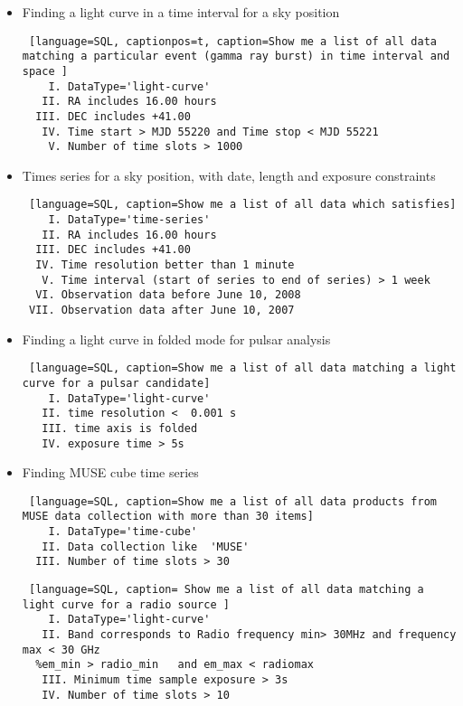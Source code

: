 
\lstset{captionpos=t}
\begin{itemize}
\item  Finding a light curve in a time interval for a sky position 
 \begin{lstlisting} [language=SQL, captionpos=t, caption=Show me a list of all data matching a particular event (gamma ray burst) in time interval and space ]
    I. DataType='light-curve'
   II. RA includes 16.00 hours
  III. DEC includes +41.00
   IV. Time start > MJD 55220 and Time stop < MJD 55221
    V. Number of time slots > 1000 
  \end{lstlisting}

\item  Times series for a sky position, with date, length and exposure constraints
\begin{lstlisting} [language=SQL, caption=Show me a list of all data which satisfies]
    I. DataType='time-series'
   II. RA includes 16.00 hours
  III. DEC includes +41.00
  IV. Time resolution better than 1 minute
   V. Time interval (start of series to end of series) > 1 week
  VI. Observation data before June 10, 2008
 VII. Observation data after June 10, 2007      
  \end{lstlisting}   
    
\item  Finding a light curve in folded mode for pulsar analysis 
\begin{lstlisting} [language=SQL, caption=Show me a list of all data matching a light curve for a pulsar candidate]
    I. DataType='light-curve'
   II. time resolution <  0.001 s 
   III. time axis is folded 
   IV. exposure time > 5s
   \end{lstlisting}  
   
\item  Finding MUSE cube time series
\begin{lstlisting} [language=SQL, caption=Show me a list of all data products from MUSE data collection with more than 30 items]
    I. DataType='time-cube'
   II. Data collection like  'MUSE'
  III. Number of time slots > 30
  \end{lstlisting}
 
\begin{lstlisting} [language=SQL, caption= Show me a list of all data matching a light curve for a radio source ]
    I. DataType='light-curve'
   II. Band corresponds to Radio frequency min> 30MHz and frequency max < 30 GHz
  %em_min > radio_min   and em_max < radiomax 
   III. Minimum time sample exposure > 3s 
   IV. Number of time slots > 10
   \end{lstlisting} 
   

\end{itemize}
